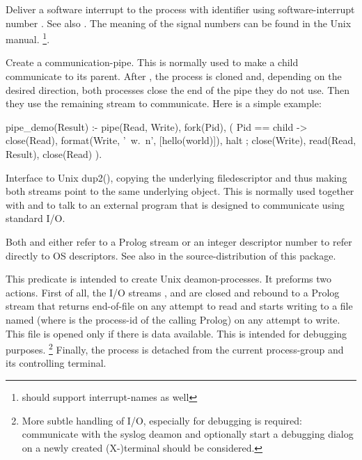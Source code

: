\documentclass[11pt]{article}
\begin{document}
\begin{description}
Deliver a software interrupt to the process with identifier 
using software-interrupt number .  See also .
The meaning of the signal numbers can be found in the Unix manual.%
\footnote{ should support interrupt-names as well}.

Create a communication-pipe. This is normally used to make a child
communicate to its parent. After , the process is cloned and,
depending on the desired direction, both processes close the end of the
pipe they do not use. Then they use the remaining stream to communicate.
Here is a simple example:

\begin{code}
pipe_demo(Result) :-
        pipe(Read, Write),
        fork(Pid),
        (   Pid == child
        ->  close(Read),
            format(Write, '~w.~n', [hello(world)]),
            halt
        ;   close(Write),
            read(Read, Result),
            close(Read)
        ).
\end{code}

\noindent
Interface to Unix dup2(), copying the underlying filedescriptor and thus
making both streams point to the same underlying object. This is
normally used together with  and  to talk to an external
program that is designed to communicate using standard I/O.

Both  and  either refer to a Prolog stream
or an integer descriptor number to refer directly to OS descriptors.
See also  in the source-distribution of this package.

This predicate is intended to create Unix deamon-processes. It preforms
two actions.  First of all, the I/O streams , 
 and  are closed and rebound to
a Prolog stream that returns end-of-file on any attempt to read and
starts writing to a file named  (where  is
the process-id of the calling Prolog) on any attempt
to write.  This file is opened only if there is data available.  This is
intended for debugging purposes.%
    \footnote{More subtle handling of I/O, especially for debugging is
	      required: communicate with the syslog deamon and
	      optionally start a debugging dialog on a newly created
	      (X-)terminal should be considered.}
Finally, the process is detached from the current process-group and its
controlling terminal.
\end{description}
\end{document}
